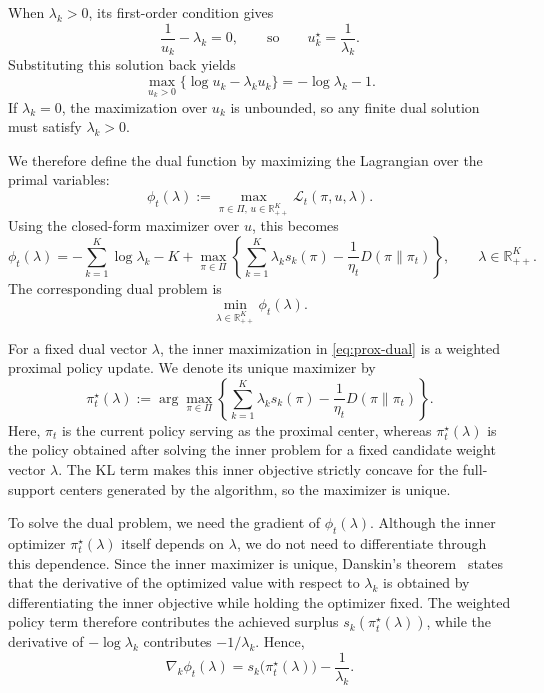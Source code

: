 \documentclass{article}
\theoremstyle{remark}
\theoremstyle{plain}
\newcommand{\R}{\mathbb{R}}
\begin{document}
When $\lambda_k>0$, its first-order condition gives
\[
\frac{1}{u_k}-\lambda_k=0,
\qquad\text{so}\qquad
u_k^\star=\frac{1}{\lambda_k}.
\]
Substituting this solution back yields
\[
\max_{u_k>0}\{\log u_k-\lambda_k u_k\}
=
-\log\lambda_k-1.
\]
If $\lambda_k=0$, the maximization over $u_k$ is unbounded, so any finite dual solution must satisfy $\lambda_k>0$.

We therefore define the dual function by maximizing the Lagrangian over the primal variables:
\[
\phi_t(\lambda)
:=
\max_{\pi\in\Pi,\,u\in\R_{++}^K}
\mathcal L_t(\pi,u,\lambda).
\]
Using the closed-form maximizer over $u$, this becomes
\begin{equation}
\phi_t(\lambda) = -\sum_{k=1}^K\log\lambda_k-K + \max_{\pi\in\Pi} \left\{ \sum_{k=1}^K\lambda_k s_k(\pi) - \frac{1}{\eta_t}D(\pi\|\pi_t) \right\},
\qquad
\lambda\in\R_{++}^K.
\label{eq:prox-dual}
\end{equation}
The corresponding dual problem is
\[
\min_{\lambda\in\R_{++}^K}\phi_t(\lambda).
\]

For a fixed dual vector $\lambda$, the inner maximization in \eqref{eq:prox-dual} is a weighted proximal policy update. We denote its unique maximizer by
\begin{equation}
\pi_t^\star(\lambda)
:=
\arg\max_{\pi\in\Pi}
\left\{
\sum_{k=1}^K\lambda_k s_k(\pi)
-
\frac{1}{\eta_t}D(\pi\|\pi_t)
\right\}.
\label{eq:weighted-policy}
\end{equation}
Here, $\pi_t$ is the current policy serving as the proximal center, whereas $\pi_t^\star(\lambda)$ is the policy obtained after solving the inner problem for a fixed candidate weight vector $\lambda$. The KL term makes this inner objective strictly concave for the full-support centers generated by the algorithm, so the maximizer is unique.

To solve the dual problem, we need the gradient of $\phi_t(\lambda)$. Although the inner optimizer
$\pi_t^\star(\lambda)$ itself depends on $\lambda$, we do not need to differentiate through this
dependence. Since the inner maximizer is unique, Danskin's theorem~\citep{danskin1967theory}
states that the derivative of the optimized value with respect to $\lambda_k$ is obtained by
differentiating the inner objective while holding the optimizer fixed. The weighted policy term
therefore contributes the achieved surplus
$s_k(\pi_t^\star(\lambda))$, while the derivative of $-\log\lambda_k$ contributes
$-1/\lambda_k$. Hence,
\begin{equation}
\nabla_k\phi_t(\lambda)
=
s_k\bigl(\pi_t^\star(\lambda)\bigr)
-
\frac{1}{\lambda_k}.
\label{eq:dual-gradient}
\end{equation}
\end{document}
